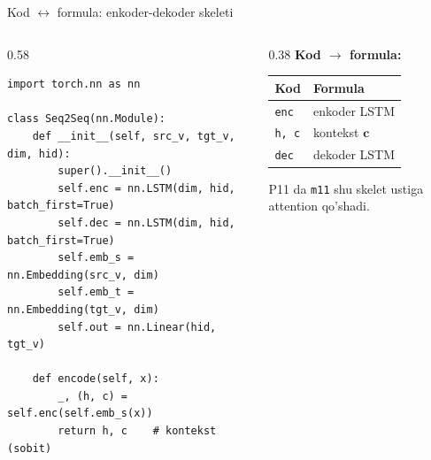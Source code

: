 \documentclass[aspectratio=169,11pt]{beamer}
\begin{document}
\begin{frame}[fragile]{Kod $\leftrightarrow$ formula: enkoder-dekoder skeleti}
  \begin{columns}[T]
    \begin{column}{0.58\textwidth}
\begin{lstlisting}
import torch.nn as nn

class Seq2Seq(nn.Module):
    def __init__(self, src_v, tgt_v, dim, hid):
        super().__init__()
        self.enc = nn.LSTM(dim, hid, batch_first=True)
        self.dec = nn.LSTM(dim, hid, batch_first=True)
        self.emb_s = nn.Embedding(src_v, dim)
        self.emb_t = nn.Embedding(tgt_v, dim)
        self.out = nn.Linear(hid, tgt_v)

    def encode(self, x):
        _, (h, c) = self.enc(self.emb_s(x))
        return h, c    # kontekst (sobit)
\end{lstlisting}
    \end{column}
    \begin{column}{0.38\textwidth}
      \textbf{Kod $\to$ formula:}\\[3pt]
      \footnotesize
      \begin{tabular}{p{1.7cm}p{1.9cm}}
        \toprule
        Kod & Formula \\
        \midrule
        \texttt{enc} & enkoder LSTM \\
        \texttt{h, c} & kontekst $\mathbf{c}$ \\
        \texttt{dec} & dekoder LSTM \\
        \bottomrule
      \end{tabular}
      \vspace{4pt}
      \begin{tcolorbox}[okbox,top=2pt,bottom=2pt]
        \footnotesize
        P11 da \texttt{m11} shu skelet ustiga attention qo'shadi.
      \end{tcolorbox}
    \end{column}
  \end{columns}
\end{frame}
\end{document}
